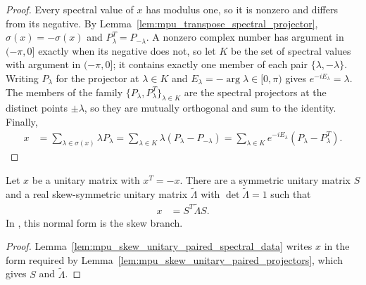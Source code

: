 \begin{proof}\leanok
    Every spectral value of $x$ has modulus one, so it is nonzero and differs
    from its negative. By
    Lemma~\ref{lem:mpu_transpose_spectral_projector}, $\sigma(x)=-\sigma(x)$
    and $P_\lambda^T=P_{-\lambda}$. A nonzero complex number has argument in
    $(-\pi,0]$ exactly when its negative does not, so let $K$ be the set of
    spectral values with argument in $(-\pi,0]$; it contains exactly one member
    of each pair $\{\lambda,-\lambda\}$. Writing $P_\lambda$ for the projector at
    $\lambda\in K$ and $E_\lambda=-\arg\lambda\in[0,\pi)$ gives
    $e^{-iE_\lambda}=\lambda$. The members of the family
    $\{P_\lambda,P_\lambda^T\}_{\lambda\in K}$ are the spectral projectors at
    the distinct points $\pm\lambda$, so they are mutually orthogonal and sum
    to the identity. Finally,
    \begin{align}
        x & =\sum_{\lambda\in\sigma(x)}\lambda P_\lambda
        =\sum_{\lambda\in K}\lambda\left(P_\lambda-P_{-\lambda}\right)
        =\sum_{\lambda\in K}e^{-iE_\lambda}\left(P_\lambda-P_\lambda^T\right).
    \end{align}
\end{proof}

\begin{lemma}
    \label{lem:mpu_skew_unitary_congruence}
    \leanok
    Let $x$ be a unitary matrix with $x^T=-x$. There are a symmetric unitary
    matrix $S$ and a real skew-symmetric unitary matrix $\widetilde\Lambda$
    with $\det\widetilde\Lambda=1$ such that
    \begin{align}
        x & = S^T\widetilde\Lambda S.
    \end{align}
    In \cite[Lemma~\texttt{lemma:conjclass-normalform-continuous}]{Cirac2017MPU}, this normal form is the skew
    branch.
\end{lemma}

\begin{proof}\leanok
    Lemma~\ref{lem:mpu_skew_unitary_paired_spectral_data} writes $x$ in the
    form required by Lemma~\ref{lem:mpu_skew_unitary_paired_projectors}, which
    gives $S$ and $\widetilde\Lambda$.
\end{proof}

